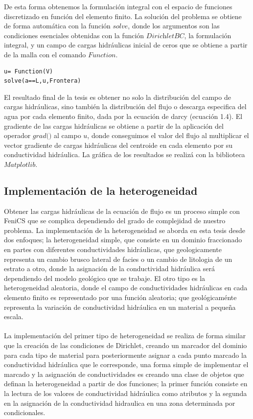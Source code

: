 De esta forma obtenemos la formulación integral con el espacio de funciones discretizado en función del elemento finito. La solución del problema se obtiene de forma automática con la función $\textit{solve}$, donde los argumentos son las condiciones esenciales obtenidas con la función $\textit{DirichletBC}$, la formulación integral, y un campo de cargas hidráulicas inicial de ceros que se obtiene a partir de la malla con el comando $\textit{Function}$.

\lstset{language=python,breaklines=true, basicstyle=\footnotesize}
\begin{lstlisting}[frame=single]
u= Function(V)
solve(a==L,u,Frontera)
\end{lstlisting}

El resultado final de la tesis es obtener no solo la distribución del campo de cargas hidráulicas, sino también la distribución del flujo o descarga especifica del agua por cada elemento finito, dada por la ecuación de darcy (ecuación 1.4). El gradiente de las cargas hidráulicas se obtiene a partir de la aplicación del operador $\textit{grad()}$ al campo $u$, donde conseguimos el valor del flujo al multiplicar el vector gradiente de cargas hidráulicas del centroide en cada elemento por su conductividad hidráulica. La gráfica de los resultados se realizá con la biblioteca $Matplotlib$. 

\subsection{Implementación de la heterogeneidad}

Obtener las cargas hidráulicas de la ecuación de flujo es un proceso simple con FeniCS que se complica dependiendo del grado de complejidad de nuestro problema. La implementación de la heterogeneidad se aborda en esta tesis desde dos enfoques; la heterogeneidad simple, que consiste en un dominio fraccionado en partes con diferentes conductividades hidráulicas, que geologicamente representa un cambio brusco lateral de facies o un cambio de litologia de un estrato a otro, donde la asignación de la conductividad hidráulica será dependiendo del modelo geológico que se trabaje. El otro tipo es la heterogeneidad aleatoria, donde el campo de conductividades hidráulicas en cada elemento finito es representado por una función aleatoria; que geológicaménte representa la variación de conductividad hidráulica en un material a pequeña escala.
\\
\\
La implementación del primer tipo de heterogeneidad se realiza de forma similar que la creación de las condiciones de Dirichlet, creando un marcador del dominio para cada tipo de material para posteriormente asignar a cada punto marcado la conductividad hidráulica que le corresponde, una forma simple de implementar el marcado y la asignación de conductividades es creando una clase de objetos que definan la heterogeneidad a partir de dos funciones; la primer función consiste en la lectura de los valores de conductividad hidráulica como atributos y la segunda en la asignación de la conductividad hidraulica  en una zona determinada por condicionales.


